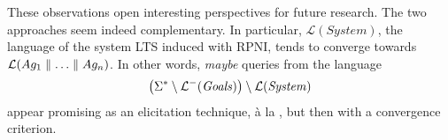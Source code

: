 These observations open interesting perspectives for future research. The two approaches seem indeed complementary. In particular, $\mathcal{L}(System)$, the language of the system LTS induced with RPNI, tends to converge towards $\mathcal{L}(Ag_1 \parallel \ldots \parallel Ag_n)$. In other words, \emph{maybe} queries from the language
\begin{align*}
\left( \Sigma^* \setminus \mathcal{L}^-(\mbox{\emph{Goals}}) \right) \setminus \mathcal{L}(\mbox{\emph{System}})
\end{align*}
appear promising as an elicitation technique, \`a la \cite{Uchitel:2007, Uchitel:2009}, but then with a convergence criterion.
